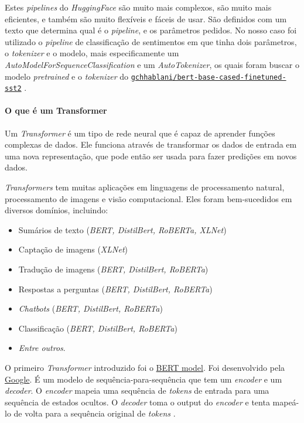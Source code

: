 Estes \textit{pipelines} do \textit{HuggingFace} são muito mais complexos, são muito mais eficientes, e também são muito flexíveis e fáceis de usar\cite{yt2}. São definidos com um texto que determina qual é o \textit{pipeline}, e os parâmetros pedidos. No nosso caso foi utilizado o \textit{pipeline} de classificação de sentimentos em que tinha dois parâmetros, o \textit{tokenizer} e o modelo, mais especificamente um \textit{AutoModelForSequenceClassification} e um \textit{AutoTokenizer}, os quais foram buscar o modelo \textit{pretrained} e o \textit{tokenizer} do \href{https://huggingface.co/gchhablani/bert-base-cased-finetuned-sst2}{\texttt{gchhablani/bert-base-cased-finetuned-sst2}} \cite{yt2}.

\paragraph{O que é um Transformer\\}

Um \textit{Transformer} é um tipo de rede neural que é capaz de aprender funções complexas de dados. Ele funciona através de transformar os dados de entrada em uma nova representação, que pode então ser usada para fazer predições em novos dados.

\textit{Transformers} tem muitas aplicações em linguagens de processamento natural, processamento de imagens e visão computacional. Eles foram bem-sucedidos em diversos domínios, incluindo:
\begin{itemize}
  \setlength\itemsep{0.05em}
    \item Sumários de texto (\textit{BERT, DistilBert, RoBERTa, XLNet})
    \item Captação de imagens (\textit{XLNet})
    \item Tradução de imagens (\textit{BERT, DistilBert, RoBERTa})
    \item Respostas a perguntas (\textit{BERT, DistilBert, RoBERTa})
    \item \textit{Chatbots} (\textit{BERT, DistilBert, RoBERTa})
    \item Classificação (\textit{BERT, DistilBert, RoBERTa})
    \item \textit{Entre outros}.
\end{itemize}

O primeiro \textit{Transformer} introduzido foi o \href{https://arxiv.org/abs/1810.04805}{BERT model}. Foi desenvolvido pela \href{https://www.google.com/}{Google}. É um modelo de sequência-para-sequência que tem um \textit{encoder} e um \textit{decoder}. O \textit{encoder} mapeia uma sequência de \textit{tokens} de entrada para uma sequência de estados ocultos. O \textit{decoder} toma o output do \textit{encoder} e tenta mapeá-lo de volta para a sequência original de \textit{tokens} \cite{yt2}.


